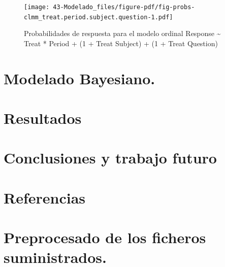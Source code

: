 \documentclass[
  12pt,
  a4paper,
  extrafontsizes,
  onecolumn,
  openright]{memoir}
\begin{document}
\begin{figure}[h]

{\centering \texttt{[image: 43-Modelado\_files/figure-pdf/fig-probs-clmm\_treat.period.subject.question-1.pdf]}

}

\caption{\label{fig-probs-clmm_treat.period.subject.question}Probabilidades
de respuesta para el modelo ordinal Response \textasciitilde{} Treat *
Period + (1 + Treat \textbar{} Subject) + (1 + Treat \textbar{}
Question)}

\end{figure}


\hypertarget{modelado-bayesiano.}{%
\chapter{Modelado Bayesiano.}\label{modelado-bayesiano.}}


\hypertarget{resultados}{%
\chapter{Resultados}\label{resultados}}


\hypertarget{conclusiones}{%
\chapter{Conclusiones y trabajo futuro}\label{conclusiones}}


\hypertarget{referencias}{%
\chapter*{Referencias}\label{referencias}}


\printbibliography[heading=none]

\cleardoublepage
{}
{}
\appendix

\hypertarget{sec-preprocess}{%
\chapter{Preprocesado de los ficheros
suministrados.}\label{sec-preprocess}}
\end{document}
